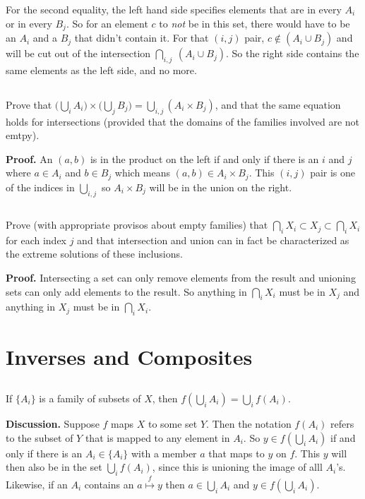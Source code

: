 \documentclass{article}
\begin{document}
\begin{enumerate}[i]
For the second equality, the left hand side specifies elements that are in every $A_i$ or in every $B_j$. So for an element $c$ to \textit{not} be in this set, there would have to be an $A_i$ and a $B_j$ that didn't contain it. For that $(i, j)$ pair, $c \not\in (A_i \cup B_j)$ and will be cut out of the intersection $\bigcap_{i, j} \ (A_i \cup B_j)$. So the right side contains the same elements as the left side, and no more.

\subsection{} Prove that $\Big(\bigcup_i A_i \Big) \times \Big( \bigcup_j B_j \Big) = \bigcup_{i,j}\left(A_i \times B_j\right)$, and that the same equation holds for intersections (provided that the domains of the families involved are not emtpy).

\textbf{Proof.} An $(a, b)$ is in the product on the left if and only if there is an $i$ and $j$ where $a \in A_i$ and $b \in B_j$ which means $(a, b) \in A_i \times B_j$. This $(i, j)$ pair is one of the indices in $\bigcup_{i,j}$ so $A_i \times B_j$ will be in the union on the right.

\subsection{} Prove (with appropriate provisos about empty families) that $\bigcap_i X_i \subset X_j \subset \bigcap_i X_i$ for each index $j$ and that intersection and union can in fact be characterized as the extreme solutions of these inclusions.

\textbf{Proof.} Intersecting a set can only remove elements from the result and unioning sets can only add elements to the result. So anything in $\bigcap_i X_i $ must be in $X_j$ and anything in $X_j$ must be in $\bigcap_i X_i$.

\section{Inverses and Composites}

\subsection{} If $\{A_i\}$ is a family of subsets of $X$, then $f\left(\bigcup_i A_i\right) = \bigcup_i f(A_i)$.

\textbf{Discussion.} Suppose $f$ maps $X$ to some set $Y$. Then the notation $f(A_i)$ refers to the subset of $Y$ that is mapped to any element in $A_i$. So $y \in f\left(\bigcup_i A_i\right)$ if and only if there is an $A_i \in \{A_i\}$ with a member $a$ that maps to $y$ on $f$. This $y$ will then also be in the set $\bigcup_i f(A_i)$, since this is unioning the image of alll $A_i$'s. Likewise, if an $A_i$ contains an $a \stackrel{f}{\longmapsto} y$ then $a \in \bigcup_i A_i$ and $y \in f\left(\bigcup_i A_i \right)$. 


\end{enumerate}
\end{document}
